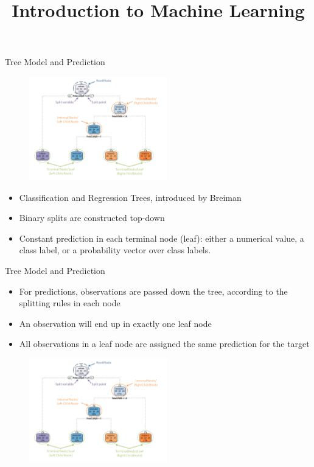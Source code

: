 \documentclass[11pt,compress,t,notes=noshow, xcolor=table]{beamer}
\title{Introduction to Machine Learning}
\institute{\href{https://compstat-lmu.github.io/lecture_i2ml/}{compstat-lmu.github.io/lecture\_i2ml}}
\date{}
\begin{document}
\sloppy

\begin{vbframe}{Tree Model and Prediction}
    \begin{figure}
    \centering
      \includegraphics[height = 4.5cm]{figure_man/labelling_of_tree.png}
    \end{figure}
  \begin{itemize}
    \item Classification and Regression Trees, introduced by Breiman
    \item Binary splits are constructed top-down
    \item Constant prediction in each terminal node (leaf): either a numerical value,
  a class label, or a probability vector over class labels.
  \end{itemize}
\end{vbframe}

\begin{vbframe}{Tree Model and Prediction}
  \begin{itemize}
    \item For predictions, observations are passed down the tree, according to the splitting rules
      in each node
    \item An observation will end up in exactly one leaf node
    \item All observations in a leaf node are assigned the same prediction for the target
  \end{itemize}
    \begin{figure}
    \centering
      \includegraphics[height = 4.5cm]{figure_man/labelling_of_tree.png}
    \end{figure}
\end{vbframe}
\end{document}
